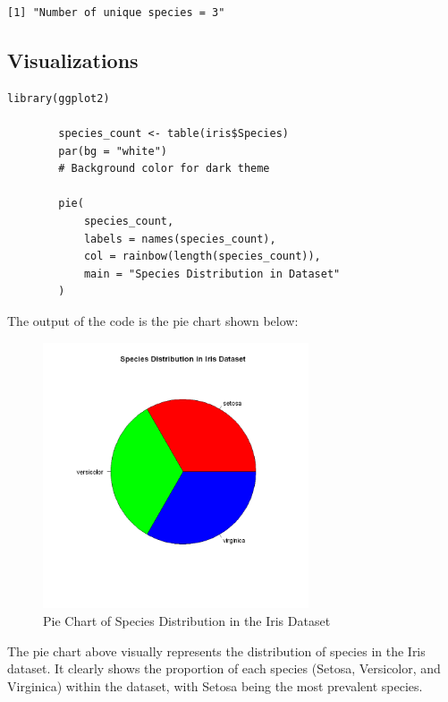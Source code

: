 \documentclass[a4paper,12pt]{article}
\begin{document}
\begin{verbatim}
[1] "Number of unique species = 3"
\end{verbatim}

\newpage
\subsection{Visualizations}

    \begin{lstlisting}[style=RStyle]
        library(ggplot2)
        
        species_count <- table(iris$Species)
        par(bg = "white")                          
        # Background color for dark theme

        pie(
            species_count,
            labels = names(species_count),
            col = rainbow(length(species_count)),
            main = "Species Distribution in Dataset"
        )
    \end{lstlisting}
        
    The output of the code is the pie chart shown below:

    \begin{figure}[h]
        \includegraphics[width=0.7\textwidth]{01.png}
        \caption{Pie Chart of Species Distribution in the Iris Dataset}
        \label{fig:pie_chart}
    \end{figure}
    The pie chart above visually represents the distribution of species in the Iris dataset. It clearly shows the proportion of each species (Setosa, Versicolor, and Virginica) within the dataset, with Setosa being the most prevalent species.
    \newpage
\end{document}
